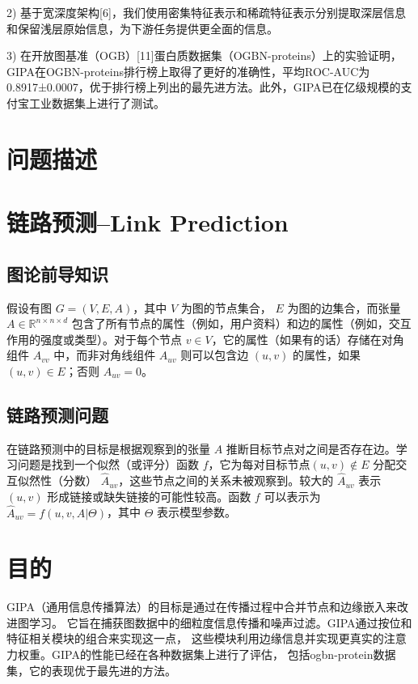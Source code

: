 \documentclass{article}
\begin{document}
2) 基于宽深度架构[6]，我们使用密集特征表示和稀疏特征表示分别提取深层信息和保留浅层原始信息，为下游任务提供更全面的信息。

3) 在开放图基准（OGB）[11]蛋白质数据集（OGBN-proteins）上的实验证明，GIPA在OGBN-proteins排行榜上取得了更好的准确性，平均ROC-AUC为0.8917±0.0007，优于排行榜上列出的最先进方法。此外，GIPA已在亿级规模的支付宝工业数据集上进行了测试。
\section*{问题描述}


\section*{链路预测--Link Prediction}
\subsection*{图论前导知识}
假设有图 $G = (V, E, A)$，其中 $V$ 为图的节点集合，
$E$ 为图的边集合，而张量 $A \in \mathbb{R}^{n \times n \times d}$ 
包含了所有节点的属性（例如，用户资料）和边的属性（例如，交互作用的强度或类型）。对于每个节点 $v \in V$，它的属性（如果有的话）存储在对角组件 $A_{vv}$ 中，而非对角线组件 $A_{uv}$ 则可以包含边 $(u, v)$ 的属性，如果 $(u, v) \in E$；否则 $A_{uv} = 0$。
\subsection*{链路预测问题}
在链路预测中的目标是根据观察到的张量 $A$ 推断目标节点对之间是否存在边。学习问题是找到一个似然（或评分）函数 $f$，它为每对目标节点$(u, v) \notin E$ 分配交互似然性（分数） $\hat{A}_{uv}$，这些节点之间的关系未被观察到。较大的 $\hat{A}_{uv}$ 表示 $(u, v)$ 形成链接或缺失链接的可能性较高。函数 $f$ 可以表示为 $\hat{A}_{uv} = f(u, v, A|\Theta)$，其中 $\Theta$ 表示模型参数。
\section*{目的}
GIPA（通用信息传播算法）的目标是通过在传播过程中合并节点和边缘嵌入来改进图学习。
它旨在捕获图数据中的细粒度信息传播和噪声过滤。GIPA通过按位和特征相关模块的组合来实现这一点，
这些模块利用边缘信息并实现更真实的注意力权重。GIPA的性能已经在各种数据集上进行了评估，
包括ogbn-protein数据集，它的表现优于最先进的方法。
\end{document}

